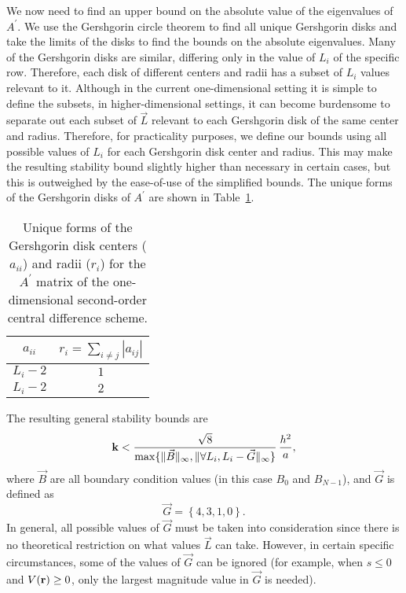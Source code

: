 \documentclass{article}
\begin{document}
We now need to find an upper bound on the absolute value of the eigenvalues of $A^{\prime}$.  We use the Gershgorin circle theorem to find all unique Gershgorin disks and take the limits of the disks to find the bounds on the absolute eigenvalues. Many of the Gershgorin disks are similar, differing only in the value of $L_i$ of the specific row.  Therefore, each disk of different centers and radii has a subset of $L_i$ values relevant to it.  Although in the current one-dimensional setting it is simple to define the subsets, in higher-dimensional settings, it can become burdensome to separate out each subset of $\vec L$ relevant to each Gershgorin disk of the same center and radius.  Therefore, for practicality purposes, we define our bounds using all possible values of $L_i$ for each Gershgorin disk center and radius.  This may make the resulting stability bound slightly higher than necessary in certain cases, but this is outweighed by the ease-of-use of the simplified bounds.  The unique forms of the Gershgorin disks of $A^{\prime}$ are shown in Table~\ref{t:1dcdgd}.
\begin{table}[htbp] 
\centering 
\caption{Unique forms of the Gershgorin disk centers ($a_{ii}$) and radii ($r_i$) for the $A^{\prime}$ matrix of the one-dimensional second-order central difference scheme.}
\begin{tabular}{|c|c|} \hline
$a_{ii}$    & $r_i=\sum_{i\ne j} |a_{ij}|$ \\ \hline
$L_i - 2$   & $1$  \\
$L_i - 2$   & $2$  \\
\hline
\end{tabular}
\label{t:1dcdgd}
\end{table}
The resulting general stability bounds are
\begin{equation}
\label{kbg}
{\bf k} < \frac{\sqrt{8}}{\max\{\lVert\vec B\rVert_{\infty},\lVert \forall L_i, L_i - \vec G\rVert_{\infty}\}}\,\frac{h^2}{a},
\end{equation}
where $\vec B$ are all boundary condition values (in this case $B_0$ and $B_{N-1}$), and $\vec G$ is defined as
\begin{equation}
\label{G1DCD}
\vec G = \left\{4,3,1,0 \right\}.
\end{equation}
In general, all possible values of $\vec  G$ must be taken into consideration since there is no theoretical restriction on what values $\vec L$ can take.  However, in certain specific circumstances, some of the values of $\vec G$ can be ignored (for example, when $s \le 0$ and $V({\bf r}) \ge 0$, only the largest magnitude value in $\vec G$ is needed).
\end{document}
